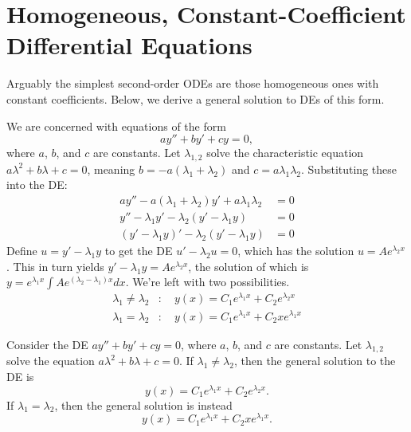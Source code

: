 \documentclass[../m082main.tex]{subfiles}
\begin{document}
\section{Homogeneous, Constant-Coefficient Differential Equations}
Arguably the simplest second-order ODEs are those homogeneous ones with constant coefficients.
Below, we derive a general solution to DEs of this form.

\begin{example}
    We are concerned with equations of the form
    \[ ay'' + by' + cy = 0, \]
    where $a$, $b$, and $c$ are constants.
    Let $\lambda_{1,2}$ solve the characteristic equation $a \lambda^2 + b \lambda + c = 0$, meaning $b = -a(\lambda_1 + \lambda_2)$ and $c = a \lambda_1 \lambda_2$.
    Substituting these into the DE:
    \begin{align*}
        ay'' - a(\lambda_1 + \lambda_2)y' + a \lambda_1 \lambda_2 &= 0 \\
        y'' - \lambda_1 y' - \lambda_2 (y' - \lambda_1 y) &= 0 \\
        (y' - \lambda_1 y)' - \lambda_2 (y' - \lambda_1 y) &= 0
    \end{align*}
    Define $u = y' - \lambda_1 y$ to get the DE $u' - \lambda_2 u = 0$, which has the solution $u = Ae^{\lambda_2 x}$.
    This in turn yields $y' - \lambda_1 y = Ae^{\lambda_2 x}$, the solution of which is $\displaystyle y = e^{\lambda_1 x} \int Ae^{(\lambda_2 - \lambda_1)x} dx$.
    We're left with two possibilities.
    \begin{align*}
        \lambda_1 \neq \lambda_2&:\quad y(x) = C_1 e^{\lambda_1 x} + C_2 e^{\lambda_2 x} \\
        \lambda_1 = \lambda_2&:\quad y(x) = C_1e^{\lambda_1 x} + C_2 x e^{\lambda_1 x}
    \end{align*}
\end{example}

\begin{theorem}
    Consider the DE $ay'' + by' + cy = 0$, where $a$, $b$, and $c$ are constants.
    Let $\lambda_{1,2}$ solve the equation $a\lambda^2 + b\lambda + c = 0$.
    If $\lambda_1 \neq \lambda_2$, then the general solution to the DE is
    \[ y(x) = C_1 e^{\lambda_1 x} + C_2 e^{\lambda_2 x}. \]
    If $\lambda_1 = \lambda_2$, then the general solution is instead
    \[ y(x) = C_1 e^{\lambda_1 x} + C_2 x e^{\lambda_1 x}. \]
\end{theorem}
\end{document}
